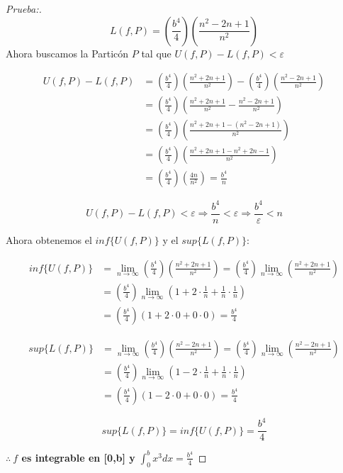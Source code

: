 \documentclass[12pt]{article}
\begin{document}
\begin{enumerate}[\hspace{9px} a)]
\begin{proof}[Prueba:]
            \[L(f,P)=\left(\frac{b^4}{4}\right)\left(\frac{n^2-2n+1}{n^2}\right)\]
            Ahora buscamos la Partic\'on $P$ tal que \(U(f,P)-L(f,P)<\varepsilon\)

            \begin{align*}
                U(f,P)-L(f,P) &= \left(\frac{b^4}{4}\right)\left(\frac{n^2+2n+1}{n^2}\right) - \left(\frac{b^4}{4}\right)\left(\frac{n^2-2n+1}{n^2}\right) \\
                &= \left(\frac{b^4}{4}\right)\left(\frac{n^2+2n+1}{n^2} - \frac{n^2-2n+1}{n^2}\right)\\
                &= \left(\frac{b^4}{4}\right)\left(\frac{n^2+2n+1-(n^2-2n+1)}{n^2}\right)\\
                &= \left(\frac{b^4}{4}\right)\left(\frac{n^2+2n+1-n^2+2n-1}{n^2}\right)\\
                &= \left(\frac{b^4}{4}\right)\left(\frac{4n}{n^2}\right) = \frac{b^4}{n}
            \end{align*}

            \begin{equation*}
                U(f,P)-L(f,P)<\varepsilon \Longrightarrow \frac{b^4}{n}<\varepsilon \Longrightarrow \frac{b^4}{\varepsilon}<n
            \end{equation*}\medskip

            Ahora obtenemos el \(inf\{U(f,P)\}\) y el \(sup\{L(f,P)\}\):

            \begin{align*}
                inf\{U(f,P)\} &= \lim_{n \to \infty}\left(\frac{b^4}{4}\right)\left(\frac{n^2+2n+1}{n^2}\right) = \left(\frac{b^4}{4}\right)\lim_{n \to \infty}\left(\frac{n^2+2n+1}{n^2}\right) \\
                &= \left(\frac{b^4}{4}\right)\lim_{n \to \infty}\left(1+2\cdot\frac{1}{n}+\frac{1}{n}\cdot\frac{1}{n}\right) \\
                &= \left(\frac{b^4}{4}\right)(1+2\cdot0+0\cdot0) = \frac{b^4}{4}
            \end{align*}

            \begin{align*}
                sup\{L(f,P)\} &= \lim_{n \to \infty}\left(\frac{b^4}{4}\right)\left(\frac{n^2-2n+1}{n^2}\right) = \left(\frac{b^4}{4}\right)\lim_{n \to \infty}\left(\frac{n^2-2n+1}{n^2}\right) \\
                &= \left(\frac{b^4}{4}\right)\lim_{n \to \infty}\left(1-2\cdot\frac{1}{n}+\frac{1}{n}\cdot\frac{1}{n}\right) \\
                &= \left(\frac{b^4}{4}\right)(1-2\cdot0+0\cdot0) = \frac{b^4}{4}
            \end{align*}

            \[sup\{L(f,P)\}=inf\{U(f,P)\}=\frac{b^4}{4}\]

            \textbf{$\therefore \ f$ es integrable en [0,b] y} \(\displaystyle\int_{0}^{b}x^3dx=\frac{b^4}{4}\)
        \end{proof}

\end{enumerate}
\end{document}
